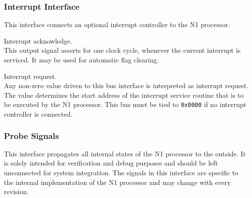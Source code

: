 % 
% 
% 
% 


\subsubsection{Interrupt Interface}
\label{integration:if:irq}
This interface connects an optional interrupt controller to the N1 processor. 


\begin{description}[style=nextline]

\item[\texttt{irq\_ack\_o}] Interrupt acknowledge. \\
  This output signal asserts for one clock cycle, whenever the current interrupt is serviced.
  It may be used for automatic flag clearing.

\item[\texttt{irq\_req\_i}] Interrupt request. \\
  Any non-zero value driven to this bus interface is interpreted as interrupt request.
  The value determines the start address of the interrupt service routine that is to be executed by the
  N1 processor. This bus must be tied to \texttt{0x0000} if no interrupt controller is connected.
  
\end{description}

\subsubsection{Probe Signals}
\label{integration:if:prb}
This interface propagates all internal states of the N1 processor to the outside.
It is solely intended for verification and debug purposes and should be left unconnected for system integration.
The signals in this interface are specific to the internal implementation of the N1 processor and may change
with every revision.

